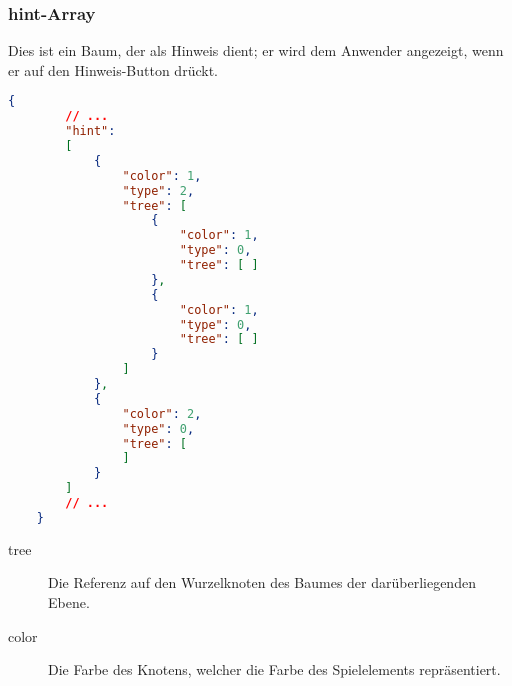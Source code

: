 \begin{minipage}{1\textwidth}

\subsubsection{hint-Array}

Dies ist ein Baum, der als Hinweis dient; er wird dem Anwender angezeigt, wenn er auf den Hinweis-Button drückt.

\begin{lstlisting}[language=json,firstnumber=1] 
	{	
		// ...
		"hint": 
		[
            {
                "color": 1,
                "type": 2,
                "tree": [
                    {
                        "color": 1,
                        "type": 0,
                        "tree": [ ]
                    },
                    {
                        "color": 1,
                        "type": 0,
                        "tree": [ ]
                    }
                ]
            },
            {
                "color": 2,
                "type": 0,
                "tree": [
                ]
            }
        ]
		// ...
	}
\end{lstlisting}


\begin{description}
	\item[tree] Die Referenz auf den Wurzelknoten des Baumes der darüberliegenden Ebene.
	\item[color] Die Farbe des Knotens, welcher die Farbe des Spielelements repräsentiert.
\end{description}

\end{minipage}





